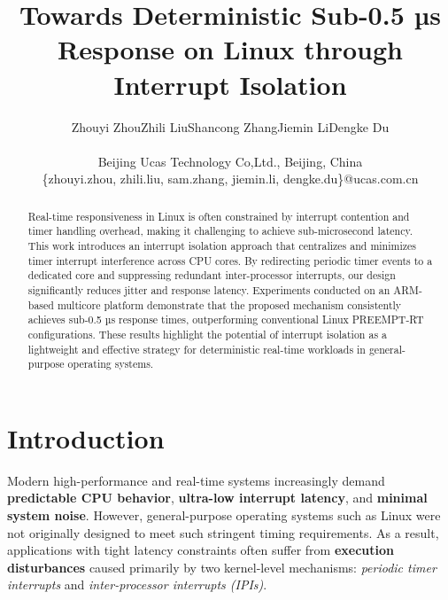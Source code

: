 \documentclass[letterpaper]{article}
\begin{document}
%
\title{Towards Deterministic Sub-0.5 µs Response on Linux through Interrupt Isolation}
\author{
\begin{tabular}{lllll}
  Zhouyi Zhou & Zhili Liu & Shancong Zhang & Jiemin Li & Dengke Du \\
\end{tabular}
\\
Beijing Ucas Technology Co,Ltd., Beijing, China\\
\{zhouyi.zhou, zhili.liu, sam.zhang, jiemin.li,
dengke.du\}@ucas.com.cn\\ 
}

\maketitle

\begin{abstract}
Real-time responsiveness in Linux is often constrained by interrupt contention and timer
handling overhead, making it challenging to achieve sub-microsecond latency.
This work introduces an interrupt isolation approach that centralizes and minimizes timer
interrupt interference across CPU cores. By redirecting periodic timer events to a
dedicated core and suppressing redundant inter-processor interrupts, our design significantly
reduces jitter and response latency. Experiments conducted on an ARM-based multicore
platform demonstrate that the proposed mechanism consistently achieves sub-0.5 µs response
times, outperforming conventional Linux PREEMPT-RT configurations. These results highlight
the potential of interrupt isolation as a lightweight and effective strategy for
deterministic real-time workloads in general-purpose operating systems.
\end{abstract}

\section{Introduction}

Modern high-performance and real-time systems increasingly demand 
\textbf{predictable CPU behavior}, \textbf{ultra-low interrupt latency}, 
and \textbf{minimal system noise}. 
However, general-purpose operating systems such as Linux were not 
originally designed to meet such stringent timing requirements. 
As a result, applications with tight latency constraints often suffer from 
\textbf{execution disturbances} caused primarily by two kernel-level 
mechanisms: \emph{periodic timer interrupts} and 
\emph{inter-processor interrupts (IPIs)}.  
\end{document}
